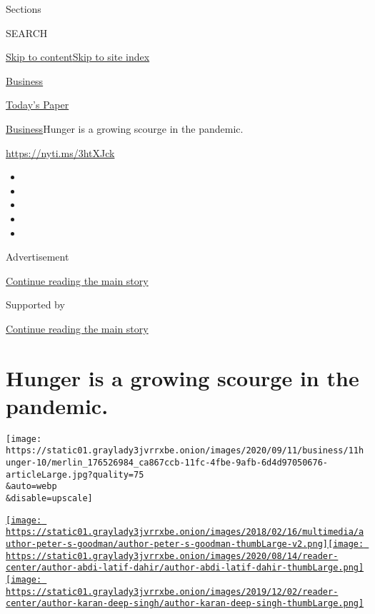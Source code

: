 Sections

SEARCH

\protect\hyperlink{site-content}{Skip to
content}\protect\hyperlink{site-index}{Skip to site index}

\href{https://www.nytimes3xbfgragh.onion/section/business}{Business}

\href{https://myaccount.nytimes3xbfgragh.onion/auth/login?response_type=cookie\&client_id=vi}{}

\href{https://www.nytimes3xbfgragh.onion/section/todayspaper}{Today's
Paper}

\href{/section/business}{Business}\textbar{}Hunger is a growing scourge
in the pandemic.

\url{https://nyti.ms/3htXJck}

\begin{itemize}
\item
\item
\item
\item
\item
\end{itemize}

Advertisement

\protect\hyperlink{after-top}{Continue reading the main story}

Supported by

\protect\hyperlink{after-sponsor}{Continue reading the main story}

\hypertarget{hunger-is-a-growing-scourge-in-the-pandemic}{%
\section{Hunger is a growing scourge in the
pandemic.}\label{hunger-is-a-growing-scourge-in-the-pandemic}}

\texttt{[image: https://static01.graylady3jvrrxbe.onion/images/2020/09/11/business/11hunger-10/merlin\_176526984\_ca867ccb-11fc-4fbe-9afb-6d4d97050676-articleLarge.jpg?quality=75\\\&auto=webp\\\&disable=upscale]}

\href{https://www.nytimes3xbfgragh.onion/by/peter-s-goodman}{\texttt{[image: https://static01.graylady3jvrrxbe.onion/images/2018/02/16/multimedia/author-peter-s-goodman/author-peter-s-goodman-thumbLarge-v2.png]}}\href{https://www.nytimes3xbfgragh.onion/by/abdi-latif-dahir}{\texttt{[image: https://static01.graylady3jvrrxbe.onion/images/2020/08/14/reader-center/author-abdi-latif-dahir/author-abdi-latif-dahir-thumbLarge.png]}}\href{https://www.nytimes3xbfgragh.onion/by/karan-deep-singh}{\texttt{[image: https://static01.graylady3jvrrxbe.onion/images/2019/12/02/reader-center/author-karan-deep-singh/author-karan-deep-singh-thumbLarge.png]}}

